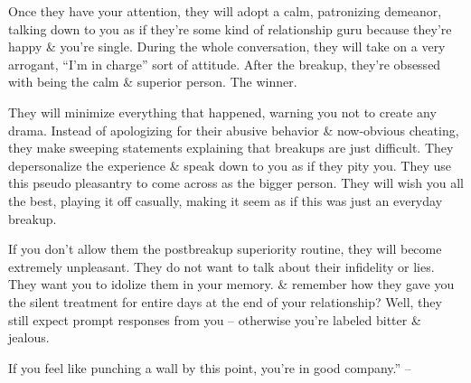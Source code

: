 \documentclass{article}
\numberwithin{equation}{section}
\begin{document}
Once they have your attention, they will adopt a calm, patronizing demeanor, talking down to you as if they're some kind of relationship guru because they're happy \& you're single. During the whole conversation, they will take on a very arrogant, ``I'm in charge'' sort of attitude. After the breakup, they're obsessed with being the calm \& superior person. The winner.

They will minimize everything that happened, warning you not to create any drama. Instead of apologizing for their abusive behavior \& now-obvious cheating, they make sweeping statements explaining that breakups are just difficult. They depersonalize the experience \& speak down to you as if they pity you. They use this pseudo pleasantry to come across as the bigger person. They will wish you all the best, playing it off casually, making it seem as if this was just an everyday breakup.

If you don't allow them the postbreakup superiority routine, they will become extremely unpleasant. They do not want to talk about their infidelity or lies. They want you to idolize them in your memory. \& remember how they gave you the silent treatment for entire days at the end of your relationship? Well, they still expect prompt responses from you -- otherwise you're labeled bitter \& jealous.

If you feel like punching a wall by this point, you're in good company.'' -- \cite[pp. 75--76]{MacKenzie2015}
\end{document}
